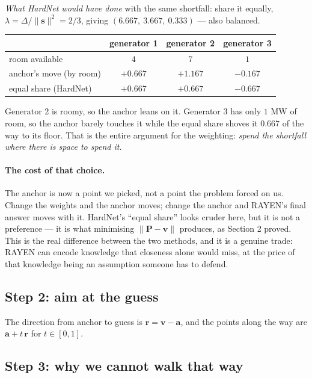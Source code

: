 \documentclass[11pt]{article}
\begin{document}
\emph{What HardNet would have done} with the same shortfall: share it equally,
$\lambda = \Delta/\|\mathbf{s}\|^2 = 2/3$, giving $(6.667,\ 3.667,\ 0.333)$ ---
also balanced.

\begin{center}
\begin{tabular}{lccc}
\toprule
 & generator 1 & generator 2 & generator 3 \\
\midrule
room available & $4$ & $7$ & $1$ \\
anchor's move (by room) & $+0.667$ & $+1.167$ & $-0.167$ \\
equal share (HardNet) & $+0.667$ & $+0.667$ & $-0.667$ \\
\bottomrule
\end{tabular}
\end{center}

Generator 2 is roomy, so the anchor leans on it. Generator 3 has only $1$ MW of
room, so the anchor barely touches it while the equal share shoves it $0.667$ of
the way to its floor. That is the entire argument for the weighting: \emph{spend
the shortfall where there is space to spend it.}

\paragraph{The cost of that choice.} The anchor is now a point we picked, not a
point the problem forced on us. Change the weights and the anchor moves; change
the anchor and RAYEN's final answer moves with it. HardNet's ``equal share'' looks
cruder here, but it is not a preference --- it is what minimising
$\|\mathbf{P}-\mathbf{v}\|$ produces, as Section 2 proved. This is the real
difference between the two methods, and it is a genuine trade: RAYEN can encode
knowledge that closeness alone would miss, at the price of that knowledge being an
assumption someone has to defend.

\subsection*{Step 2: aim at the guess}

The direction from anchor to guess is $\mathbf{r} = \mathbf{v}-\mathbf{a}$, and
the points along the way are $\mathbf{a}+t\,\mathbf{r}$ for $t\in[0,1]$.

\subsection*{Step 3: why we cannot walk that way}
\end{document}
